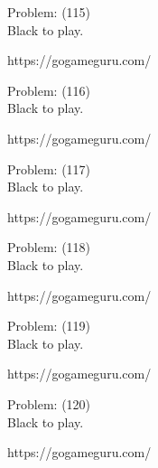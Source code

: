 \documentclass[11pt]{article}
\begin{document}
\begin{minipage}[t]{0.5\textwidth}
  {\centering
  
Problem: (115)\\
Black to play.

https://gogameguru.com/\\
  }
\end{minipage}
\begin{minipage}[t]{0.5\textwidth}
  {\centering
  
Problem: (116)\\
Black to play.

https://gogameguru.com/\\
  }
\end{minipage}
\begin{minipage}[t]{0.5\textwidth}
  {\centering
  
Problem: (117)\\
Black to play.

https://gogameguru.com/\\
  }
\end{minipage}
\begin{minipage}[t]{0.5\textwidth}
  {\centering
  
Problem: (118)\\
Black to play.

https://gogameguru.com/\\
  }
\end{minipage}
\begin{minipage}[t]{0.5\textwidth}
  {\centering
  
Problem: (119)\\
Black to play.

https://gogameguru.com/\\
  }
\end{minipage}
\begin{minipage}[t]{0.5\textwidth}
  {\centering
  
Problem: (120)\\
Black to play.

https://gogameguru.com/\\
  }
\end{minipage}
\end{document}
